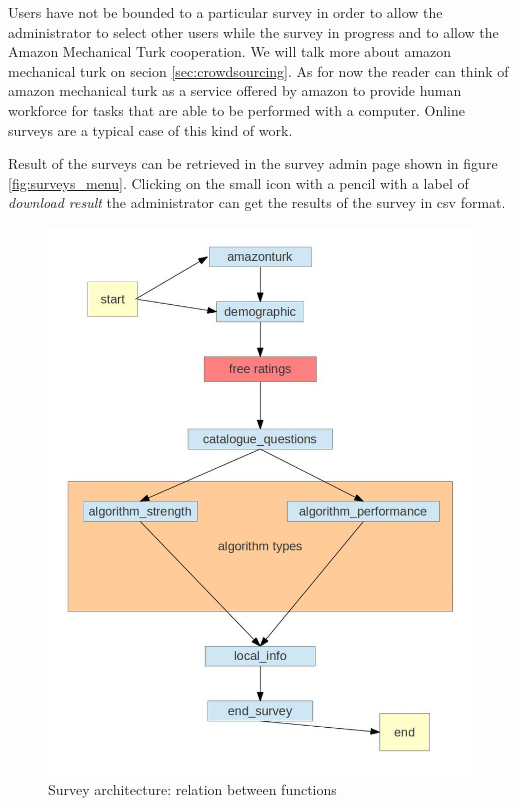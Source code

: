 Users have not be bounded to a particular survey in order to allow the administrator to select other users while the survey in progress and to allow the Amazon Mechanical Turk \cite{amazon-mechanical-turk} cooperation. We will talk more about amazon mechanical turk on secion \ref{sec:crowdsourcing}. As for now the reader can think of amazon mechanical turk as a service offered by amazon to provide human workforce for tasks that are able to be performed with a computer. Online surveys are a typical case of this kind of work.

Result of the surveys can be retrieved in the survey admin page shown in figure \ref{fig:surveys_menu}. Clicking on the small icon with a pencil with a label of \textit{download result} the administrator can get the results of the survey in \ac{csv} format.

\begin{figure}
  \centering
  \includegraphics[width=\textwidth]{figures/movish_survey_architecture.jpg}
  \caption{Survey architecture: relation between functions}
  \label{fig:survey_architecture}
\end{figure}


